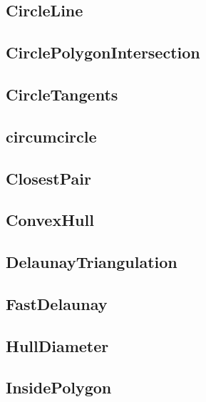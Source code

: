 \subsection{CircleLine}
\raggedbottom
\hrulefill
\subsection{CirclePolygonIntersection}
\raggedbottom
\hrulefill
\subsection{CircleTangents}
\raggedbottom
\hrulefill
\subsection{circumcircle}
\raggedbottom
\hrulefill
\subsection{ClosestPair}
\raggedbottom
\hrulefill
\subsection{ConvexHull}
\raggedbottom
\hrulefill
\subsection{DelaunayTriangulation}
\raggedbottom
\hrulefill
\subsection{FastDelaunay}
\raggedbottom
\hrulefill
\subsection{HullDiameter}
\raggedbottom
\hrulefill
\subsection{InsidePolygon}
\raggedbottom
\hrulefill
